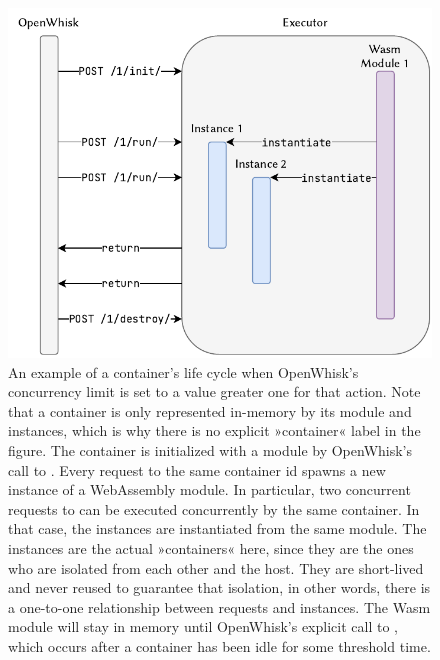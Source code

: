 \begin{figure}
    \centering
    \includegraphics{figures/OpenWhiskConcurrencyLimitGreaterOne.pdf}
    \caption{An example of a container's life cycle when OpenWhisk's concurrency limit is set to a value greater one for that action. Note that a container is only represented in-memory by its module and instances, which is why there is no explicit »container« label in the figure. The container is initialized with a module by OpenWhisk's call to . Every  request to the same container id spawns a new instance of a WebAssembly module. In particular, two concurrent requests to  can be executed concurrently by the same container. In that case, the instances are instantiated from the same module. The instances are the actual »containers« here, since they are the ones who are isolated from each other and the host. They are short-lived and never reused to guarantee that isolation, in other words, there is a one-to-one relationship between  requests and instances. The Wasm module will stay in memory until OpenWhisk's explicit call to , which occurs after a container has been idle for some threshold time.}
    \label{fig:openwhisk-concurrency-limit-greater-one}
\end{figure}


